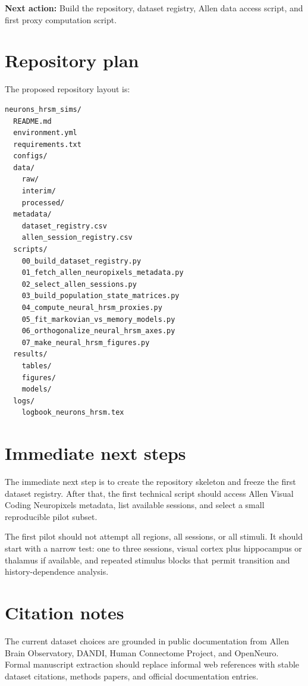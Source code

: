 \documentclass[11pt]{article}
\begin{document}
\textbf{Next action:} Build the repository, dataset registry, Allen data access script, and first proxy computation script.

\section{Repository plan}

The proposed repository layout is:

\begin{verbatim}
neurons_hrsm_sims/
  README.md
  environment.yml
  requirements.txt
  configs/
  data/
    raw/
    interim/
    processed/
  metadata/
    dataset_registry.csv
    allen_session_registry.csv
  scripts/
    00_build_dataset_registry.py
    01_fetch_allen_neuropixels_metadata.py
    02_select_allen_sessions.py
    03_build_population_state_matrices.py
    04_compute_neural_hrsm_proxies.py
    05_fit_markovian_vs_memory_models.py
    06_orthogonalize_neural_hrsm_axes.py
    07_make_neural_hrsm_figures.py
  results/
    tables/
    figures/
    models/
  logs/
    logbook_neurons_hrsm.tex
\end{verbatim}

\section{Immediate next steps}

The immediate next step is to create the repository skeleton and freeze the first dataset registry. After that, the first technical script should access Allen Visual Coding Neuropixels metadata, list available sessions, and select a small reproducible pilot subset.

The first pilot should not attempt all regions, all sessions, or all stimuli. It should start with a narrow test: one to three sessions, visual cortex plus hippocampus or thalamus if available, and repeated stimulus blocks that permit transition and history-dependence analysis.

\section{Citation notes}

The current dataset choices are grounded in public documentation from Allen Brain Observatory, DANDI, Human Connectome Project, and OpenNeuro. Formal manuscript extraction should replace informal web references with stable dataset citations, methods papers, and official documentation entries.



\end{document}
